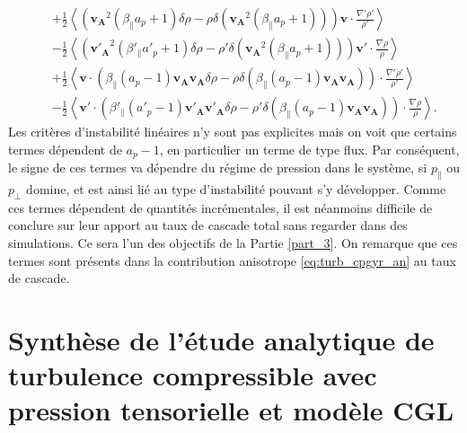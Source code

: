 \begin{equation}
{\begin{array}{lcl}
&& + \frac{1}{2} \left<  \left(  \boldsymbol{v_A}^2 \left(\beta_{\parallel}a_p+1\right) \delta \rho - \rho \delta \left(\boldsymbol{v_A}^2 \left(\beta_{\parallel}a_p+1\right)\right)  \right)\boldsymbol{v}\cdot  \frac{\nabla' \rho'}{\rho'} \right>\\
&&- \frac{1}{2} \left<\left(  \boldsymbol{v'_A}^2 \left(\beta'_{\parallel}a'_p+1\right) \delta \rho - \rho' \delta \left(\boldsymbol{v_A}^2 \left(\beta_{\parallel}a_p+1\right)\right)  \right) \boldsymbol{v'}\cdot  \frac{\nabla \rho}{\rho}  \right> \\
&& + \frac{1}{2} \left< \boldsymbol{v} \cdot \left(  \beta_{\parallel}\left(a_p-1\right) \boldsymbol{v_A} \boldsymbol{v_A} \delta \rho - \rho \delta \left(\beta_{\parallel}\left(a_p-1\right) \boldsymbol{v_A} \boldsymbol{v_A}\right)  \right)\cdot  \frac{\nabla' \rho'}{\rho'} \right>\\
&&-\frac{1}{2}\left< \boldsymbol{v'} \cdot \left( \beta'_{\parallel}\left(a'_p-1\right) \boldsymbol{v'_A} \boldsymbol{v'_A}  \delta \rho - \rho' \delta \left(\beta_{\parallel}\left(a_p-1\right) \boldsymbol{v_A} \boldsymbol{v_A} \right)\right) \cdot  \frac{\nabla \rho}{\rho} \right>.
\end{array}}
\end{equation}
Les critères d'instabilité linéaires n'y sont pas explicites mais on voit que certains termes dépendent de $a_p-1$, en particulier un terme de type flux. Par conséquent, le signe de ces termes va dépendre du régime de pression dans le système, si $p_{\parallel}$ ou $p_{\perp}$ domine, et est ainsi lié au type d'instabilité pouvant s'y développer. Comme ces termes dépendent de quantités incrémentales, il est néanmoins difficile de conclure sur leur apport au taux de cascade total sans regarder dans des simulations. Ce sera l'un des objectifs de la Partie \ref{part_3}. On remarque que ces termes sont présents dans la contribution anisotrope \eqref{eq:turb_cpgyr_an} au taux de cascade.

\newpage
\section{Synthèse de l'étude analytique de turbulence compressible avec pression tensorielle et modèle \ac{CGL}}
\label{synt-21}

